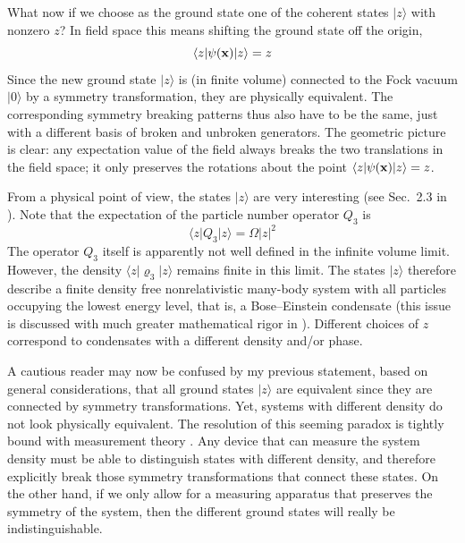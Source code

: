 \documentclass[final,2p,times,12pt,sort&compress]{elsarticle}
\newcommand\vek[1]{{\boldsymbol{\bf #1}}}   %
\newcommand\bra[1]{\langle#1\vert}          %
\newcommand\ket[1]{\vert#1\rangle}          %
\newcommand\vr{\varrho}
\newcommand\abs[1]{\left|#1\right|}         %
\begin{document}
What now if we choose as the ground state one of the coherent states $\ket z$
with nonzero $z$? In field space this means shifting the ground state off the
origin,
\begin{equation}
\bra z\psi(\vek x)\ket z=z
\end{equation}
Since the new ground state $\ket z$ is (in finite volume) connected to the Fock
vacuum $\ket0$ by a symmetry transformation, they are physically equivalent.
The corresponding symmetry breaking patterns thus also have to be the same,
just with a different basis of broken and unbroken generators. The geometric
picture is clear: any expectation value of the field always breaks the two
translations in the field space; it only preserves the rotations about the
point $\bra z\psi(\vek x)\ket z=z$.

From a physical point of view, the states $\ket z$ are very interesting
(see Sec.~2.3 in \cite{Miransky:1993mi}). Note that the expectation of the
particle number operator $Q_3$ is
\begin{equation}
\bra zQ_3\ket z=\Omega\abs z^2
\label{NRQ}
\end{equation}
The operator $Q_3$ itself is apparently not well defined in the infinite volume
limit. However, the density $\bra z\vr_3\ket z$ remains finite in this limit.
The states $\ket z$ therefore describe a finite density free nonrelativistic
many-body system with all particles occupying the lowest energy level, that is,
a Bose--Einstein condensate (this issue is discussed with much greater
mathematical rigor in \cite{Araki:1963aw}). Different choices of $z$ correspond
to condensates with a different density and/or phase.

A cautious reader may now be confused by my previous statement, based on
general considerations, that all ground states $\ket z$ are equivalent since
they are connected by symmetry transformations. Yet, systems with different
density do not look physically equivalent. The resolution of this seeming
paradox is tightly bound with measurement theory \cite{Guralnik:1968gu}. Any
device that can measure the system density must be able to distinguish states
with different density, and therefore explicitly break those symmetry
transformations that connect these states. On the other hand, if we only allow
for a measuring apparatus that preserves the symmetry of the system, then the
different ground states will really be indistinguishable.
\end{document}
